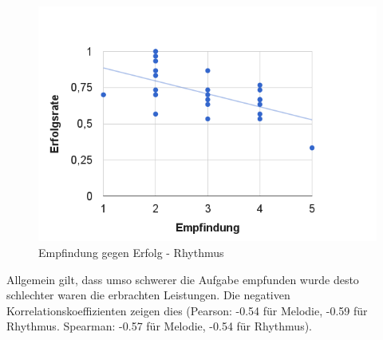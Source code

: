 \documentclass{acm_proc_article-sp}
\begin{document}
\begin{figure}[H]
\includegraphics[width=1.0\linewidth]{Abbildungen/Empfindugn-Erfolg_Rhythmus.png}
\caption{Empfindung gegen Erfolg - Rhythmus}
\label{EmpfindungRhythmus}
\end{figure}
Allgemein gilt, dass umso schwerer die Aufgabe empfunden wurde desto schlechter waren die erbrachten Leistungen. Die negativen Korrelationskoeffizienten zeigen dies (Pearson: -0.54 für Melodie, -0.59 für Rhythmus. Spearman: -0.57 für Melodie, -0.54 für Rhythmus).
\end{document}
